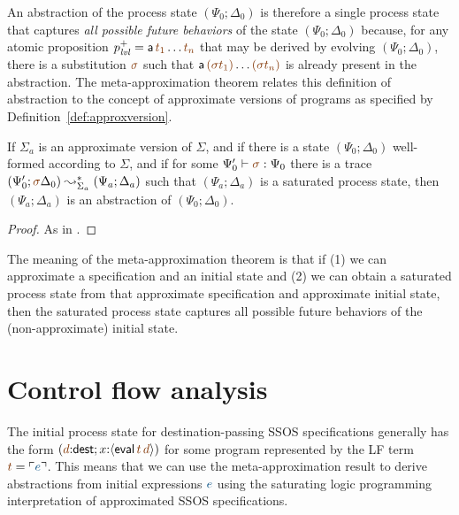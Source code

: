 An abstraction of the process state $(\Psi_0; \Delta_0)$ is therefore
a single process state that captures {\it all possible future
  behaviors} of the state $(\Psi_0; \Delta_0)$ because, for any atomic
proposition $p^+_\mlvl = {\sf a}\,\lf{t_1}\ldots \lf{t_n}$ that may be derived
by evolving $(\Psi_0; \Delta_0)$, there is a substitution $\lf\sigma$
such that ${\sf a}\,\lf{(\sigma t_1)}\ldots\lf{(\sigma t_n)}$ is already present
in the abstraction. The meta-approximation theorem relates this definition
of abstraction to the concept of approximate versions of programs as
specified by Definition~\ref{def:approxversion}.  

\bigskip
\begin{theorem}\label{thm:metapprox}
  If $\Sigma_a$ is an approximate version of $\Sigma$, and if there is a
  state $(\Psi_0; \Delta_0)$ well-formed according to $\Sigma$, and if
  for some $\Psi_0' \vdash \lf\sigma : \Psi_0$ there is a trace
  $(\Psi_0'; \lf\sigma\Delta_0) \leadsto^*_{\Sigma_a} (\Psi_a; \Delta_a)$
  such that $(\Psi_a; \Delta_a)$ is a saturated process state, then
  $(\Psi_a; \Delta_a)$ is an abstraction of $(\Psi_0; \Delta_0)$.
\end{theorem}

\begin{proof}
  As in \cite[Theorem 3]{simmons11logical}.
\end{proof}

The meaning of the meta-approximation theorem is that if (1) we can
approximate a specification and an initial state and (2) we can obtain
a saturated process state from that approximate specification
and approximate initial state, then the saturated process state captures
all possible future behaviors of the (non-approximate) initial state. 






\section{Control flow analysis}
\label{sec:0cfa}

The initial process state for destination-passing SSOS specifications
generally has the form 
$(\lf{d}{:}{\sf dest}; x{:}\susp{{\sf eval}\,\lf{t}\,\lf{d}})$
for some program represented by the LF term $\lf{t} = \interp{e}$. 
This means that we
can use the meta-approximation result to derive abstractions from
initial expressions $\obj{e}$ using the saturating logic programming
interpretation of approximated SSOS specifications.

